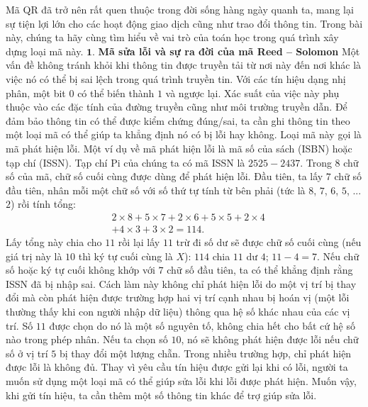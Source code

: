 \begin{multicols}{2}
	Mã QR đã trở nên rất quen thuộc trong đời sống hàng ngày quanh ta, mang lại sự tiện lợi lớn cho các hoạt động giao dịch cũng như trao đổi thông tin. Trong bài này, chúng ta hãy cùng tìm hiểu về vai trò của toán học trong quá trình xây dựng loại mã này.
	\vskip 0.05cm
	$\pmb{1.}$ \textbf{\color{toanhocdoisong}\color{toanhocdoisong}Mã sửa lỗi và sự ra đời của mã Reed -- Solomon}
	\vskip 0.05cm
	Một vấn đề không tránh khỏi khi thông tin được truyền tải từ nơi này đến nơi khác là việc nó có thể bị sai lệch trong quá trình truyền tin. Với các tín hiệu dạng nhị phân, một bit $0$ có thể biến thành $1$ và ngược lại. Xác suất của việc này phụ thuộc vào các đặc tính của đường truyền cũng như môi trường truyền dẫn.
	\vskip 0.05cm
	Để đảm bảo thông tin có thể được kiểm chứng đúng/sai, ta cần ghi thông tin theo một loại mã có thể giúp ta khẳng định nó có bị lỗi hay không. Loại mã này gọi là mã phát hiện lỗi.
	\vskip 0.05cm
	Một ví dụ về mã phát hiện lỗi là mã số của sách (ISBN) hoặc tạp chí (ISSN). Tạp chí Pi của chúng ta có mã ISSN là $2525-2437$. Trong $8$ chữ số của mã, chữ số cuối cùng được dùng để phát hiện lỗi. Đầu tiên, ta lấy $7$ chữ số đầu tiên, nhân mỗi một chữ số với số thứ tự tính từ bên phải (tức là $8$, $7$, $6$, $5$, ... $2$) rồi tính tổng:
	\setlength{\abovedisplayskip}{4pt}
	\setlength{\belowdisplayskip}{4pt}
	\begin{align*}
		&2\times8+5\times7+2\times6+5\times5+2\times4\\
		&+4\times3+3\times2=114.
	\end{align*}
	Lấy tổng này chia cho $11$ rồi lại lấy $11$ trừ đi số dư sẽ được chữ số cuối cùng (nếu giá trị này là $10$ thì ký tự cuối cùng là $X$): $114$ chia $11$ dư $4$; $11 - 4 = 7$.
	\vskip 0.05cm
	Nếu chữ số hoặc ký tự cuối không khớp với $7$ chữ số đầu tiên, ta có thể khẳng định rằng ISSN đã bị nhập sai. Cách làm này không chỉ phát hiện lỗi do một vị trí bị thay đổi mà còn phát hiện được trường hợp hai vị trí cạnh nhau bị hoán vị (một lỗi thường thấy khi con người nhập dữ liệu) thông qua hệ số khác nhau của các vị trí. Số $11$ được chọn do nó là một số nguyên tố, không chia hết cho bất cứ hệ số nào trong phép nhân. Nếu ta chọn số $10$, nó sẽ không phát hiện được lỗi nếu chữ số ở vị trí $5$ bị thay đổi một lượng chẵn.
	\vskip 0.05cm
	Trong nhiều trường hợp, chỉ phát hiện được lỗi là không đủ. Thay vì yêu cầu tín hiệu được gửi lại khi có lỗi, người ta muốn sử dụng một loại mã có thể giúp sửa lỗi khi lỗi được phát hiện. Muốn vậy, khi gửi tín hiệu, ta cần thêm một số thông tin khác để trợ giúp sửa lỗi.

\end{multicols}
